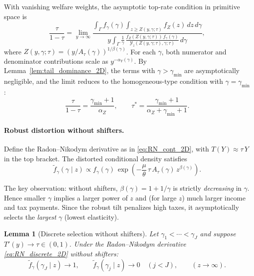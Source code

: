 \documentclass[12pt,a4paper]{article}
\theoremstyle{definition}
\theoremstyle{plain}
\newtheorem{lemma}{Lemma}[section]
\theoremstyle{remark}
\newcommand{\calY}{\mathcal{Y}}
\begin{document}
With vanishing welfare weights, the asymptotic top-rate condition in primitive space is
\begin{equation}
\label{eq:FOC_no_shifter_2D}
  \frac{\tau}{1-\tau} = \lim_{y \to \infty}
  \frac{\int_{\Gamma} f_{\gamma}(\gamma)\int_{z \geq Z(y,\gamma;\tau)} f_Z(z)\,dz\,d\gamma}
  {y\int_{\Gamma}\frac{1}{\gamma}\,\frac{f_Z(Z(y,\gamma;\tau))\,f_{\gamma}(\gamma)}{\calY_z(Z(y,\gamma;\tau),\gamma;\tau)}\,d\gamma},
\end{equation}
where $Z(y,\gamma;\tau) = (y/A_{\tau}(\gamma))^{1/\beta(\gamma)}$.  For each $\gamma$, both numerator and denominator contributions scale as $y^{-\alpha_Y(\gamma)}$.  By Lemma~\ref{lem:tail_dominance_2D}, the terms with $\gamma > \gamma_{\min}$ are asymptotically negligible, and the limit reduces to the homogeneous-type condition with $\gamma = \gamma_{\min}$:
\begin{equation}
\label{eq:no_shifter_tau_2D}
  \frac{\tau}{1-\tau} = \frac{\gamma_{\min}+1}{\alpha_Z}, \qquad \tau^* = \frac{\gamma_{\min}+1}{\alpha_Z+\gamma_{\min}+1}.
\end{equation}

\paragraph{Robust distortion without shifters.}

Define the Radon--Nikodym derivative as in \eqref{eq:RN_cont_2D}, with $T(Y) \approx \tau\,Y$ in the top bracket.  The distorted conditional density satisfies
\begin{equation}
\label{eq:m_no_shifter_2D}
  \widetilde{f}_{\gamma}(\gamma \mid z) \propto f_{\gamma}(\gamma)\,\exp\!\left(-\frac{\mu}{\theta}\,\tau\,A_{\tau}(\gamma)\,z^{\beta(\gamma)}\right).
\end{equation}

The key observation: without shifters, $\beta(\gamma) = 1 + 1/\gamma$ is strictly \emph{decreasing} in $\gamma$.  Hence smaller $\gamma$ implies a larger power of $z$ and (for large $z$) much larger income and tax payments.  Since the robust tilt penalizes high taxes, it asymptotically selects the \emph{largest} $\gamma$ (lowest elasticity).

\begin{lemma}[Discrete selection without shifters]
\label{lem:discrete_no_shifter_2D}
Let $\gamma_1 < \cdots < \gamma_J$ and suppose $T'(y) \to \tau \in (0,1)$.  Under the Radon--Nikodym derivative \eqref{eq:RN_discrete_2D} without shifters:
\[
  \widetilde{f}_{\gamma}(\gamma_J \mid z) \to 1, \qquad \widetilde{f}_{\gamma}(\gamma_j \mid z) \to 0 \quad (j < J), \qquad (z \to \infty).
\]
\end{lemma}
\end{document}
